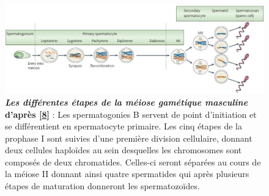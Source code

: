 \documentclass[12pt,a4paper,twoside]{ugathesis}
\theoremstyle{definition}
\theoremstyle{definition}
\theoremstyle{definition}
\theoremstyle{remark}
\begin{document}
\begin{figure}

{\centering \includegraphics[scale=0.33]{figure/Meiosis_Stages} 

}

\caption[Les différentes étapes de la méiose gamétique masculine]{\textbf{\emph{Les différentes étapes de la méiose
gamétique masculine} d'après
{[}\protect\hyperlink{ref-Sasaki2008}{8}{]}} : Les spermatogonies B
servent de point d'initiation et se différentient en spermatocyte
primaire. Les cinq étapes de la prophase I sont suivies d'une première
division cellulaire, donnant deux cellules haploïdes au sein desquelles
les chromosomes sont composés de deux chromatides. Celles-ci seront
séparées au cours de la méiose II donnant ainsi quatre spermatides qui
après plusieurs étapes de maturation donneront les spermatozoïdes.}\label{fig:pictmeiose}
\end{figure}











\newpage
\end{document}
